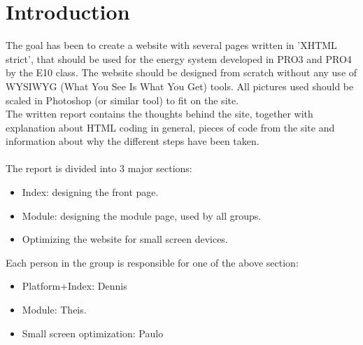 \chapter{Introduction}
The goal has been to create a website with several pages written in 'XHTML strict', that should be used for the energy system developed in PRO3 and PRO4 by the E10 class. The website should be designed from scratch without any use of WYSIWYG (What You See Is What You Get) tools. All pictures used should be scaled in Photoshop (or similar tool) to fit on the site. \\The written report contains the thoughts behind the site, together with explanation about HTML coding in general, pieces of code from the site and information about why the different steps have been taken. \\
\\
The report is divided into 3 major sections:
\begin{itemize}
	\item Index: designing the front page.
	\item Module: designing the module page, used by all groups.
	\item Optimizing the website for small screen devices.
\end{itemize}
Each person in the group is responsible for one of the above section:
\begin{itemize}
	\item Platform+Index: Dennis
	\item Module: Theis.
	\item Small screen optimization: Paulo
\end{itemize}
